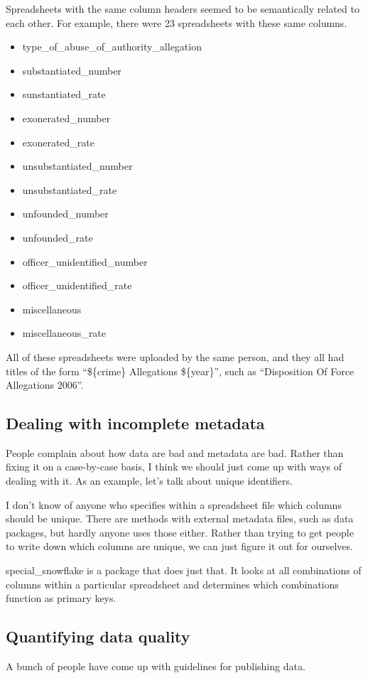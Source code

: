 \documentclass{acm_proc_article-sp}
\begin{document}
Spreadsheets with the same column headers seemed to be semantically related to
each other. For example, there were 23 spreadsheets with these same columns.
\begin{itemize}
\item type\_of\_abuse\_of\_authority\_allegation
\item substantiated\_number
\item sunstantiated\_rate
\item exonerated\_number
\item exonerated\_rate
\item unsubstantiated\_number
\item unsubstantiated\_rate
\item unfounded\_number
\item unfounded\_rate
\item officer\_unidentified\_number
\item officer\_unidentified\_rate
\item miscellaneous
\item miscellaneous\_rate
\end{itemize}

All of these spreadsheets were uploaded by the same person, and they all had
titles of the form ``\$\{crime\} Allegations \$\{year\}'', such as
``Disposition Of Force Allegations 2006''.



\subsection{Dealing with incomplete metadata}
People complain about how data are bad and metadata are bad. Rather than
fixing it on a case-by-case basis, I think we should just come up with ways
of dealing with it. As an example, let's talk about unique identifiers.

I don't know of anyone who specifies within a spreadsheet file which columns
should be unique. There are methods with external metadata files, such as data
packages\cite{datapackages}, but hardly anyone uses those either. Rather than
trying to get people to write down which columns are unique, we can just figure
it out for ourselves.

special\_snowflake\cite{special_snowflake} is a package that does just that.
It looks at all combinations of columns within a particular spreadsheet and
determines which combinations function as primary keys.

\subsection{Quantifying data quality}
A bunch of people have come up with guidelines for publishing data.
\end{document}
